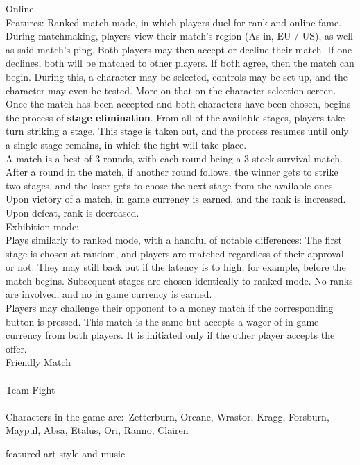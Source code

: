 \documentclass[11pt]{article}
\begin{document}
Online\\
Features: Ranked match mode, in which players duel for rank and online fame. During matchmaking, players view their match's region (As in, EU / US), as well as said match's ping. Both players may then accept or decline their match. If one declines, both will be matched to other players. If both agree, then the match can begin. During this, a character may be selected, controls may be set up, and the character may even be tested. More on that on the character selection screen.\\
Once the match has been accepted and both characters have been chosen, begins the process of \textbf{stage elimination}. From all of the available stages, players take turn striking a stage. This stage is taken out, and the process resumes until only a single stage remains, in which the fight will take place.\\
A match is a best of 3 rounds, with each round being a 3 stock survival match. After a round in the match, if another round follows, the winner gets to strike two stages, and the loser gets to chose the next stage from the available ones.\\
Upon victory of a match, in game currency is earned, and the rank is increased. Upon defeat, rank is decreased.\\

Exhibition mode:\\
Plays similarly to ranked mode, with a handful of notable differences: The first stage is chosen at random, and players are matched regardless of their approval or not. They may still back out if the latency is to high, for example, before the match begins. Subsequent stages are chosen identically to ranked mode. No ranks are involved, and no in game currency is earned.\\
Players may challenge their opponent to a money match if the corresponding button is pressed. This match is the same but accepts a wager of in game currency from both players. It is initiated only if the other player accepts the offer.\\

Friendly Match\\
\\
Team Fight\\
\\

Characters in the game are:\
Zetterburn, Orcane, Wrastor, Kragg, Forsburn, Maypul, Absa, Etalus, Ori, Ranno, Clairen %


featured art style and music\\ %

{}

\end{document}

